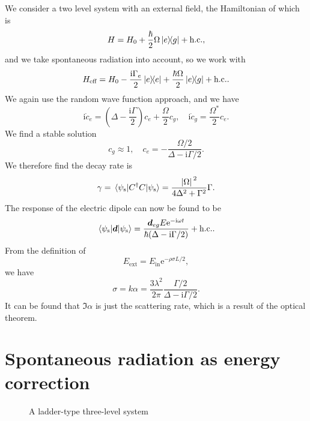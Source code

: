 \documentclass[hyperref, a4paper]{article}
\newcommand*{\ii}{\mathrm{i}}
\newcommand*{\ee}{\mathrm{e}}
\begin{document}
We consider a two level system with an external field, the Hamiltonian of which is  
\begin{equation}
    H = H_0 + \frac{\hbar}{2} \Omega \dyad{e}{g} + \text{h.c.},
\end{equation}
and we take spontaneous radiation into account, so we work with 
\begin{equation}
    H_\text{eff} = H_0 - \frac{\ii \Gamma_e}{2} \dyad{e} + \frac{\hbar \Omega}{2} \dyad{e}{g} + \text{h.c.}.
\end{equation} 
We again use the random wave function approach, and we have 
\begin{equation}
    \ii \dot{c}_e = \left( \Delta - \frac{\ii \Gamma}{2} \right) c_e + \frac{\Omega}{2} c_g, \quad
    \ii \dot{c}_g = \frac{\Omega^*}{2} c_e.
\end{equation}
We find a stable solution 
\begin{equation}
    c_g \approx 1, \quad c_e = - \frac{\Omega / 2}{\Delta - \ii \Gamma / 2}.
\end{equation}
We therefore find the decay rate is  
\begin{equation}
    \gamma = \mel*{\psi_\text{s}}{C^\dagger C}{\psi_\text{s}} = \frac{\abs*{\Omega}^2}{4 \Delta^2 + \Gamma^2} \Gamma.
\end{equation}
The response of the electric dipole can now be found to be 
\begin{equation}
    \expval*{\vb*{d}}{\psi_\text{s}} = \frac{\vb*{d}_{eg} E \ee^{- \ii \omega t}}{\hbar (\Delta - \ii \Gamma /2)} + \text{h.c.}.
\end{equation}
From the definition of 
\begin{equation}
    E_\text{ext} = E_\text{in} \ee^{- \rho \sigma L / 2},
\end{equation}
we have 
\begin{equation}
    \sigma = k \alpha = \frac{3 \lambda^2}{2 \pi} \frac{\Gamma / 2}{\Delta - \ii \Gamma / 2}.
\end{equation}
It can be found that $\Im \alpha$ is just the scattering rate, which is a result of the optical theorem.

\section{Spontaneous radiation as energy correction}

\begin{figure}
    \centering
    
    \caption{A ladder-type three-level system}
    \label{fig:ladder-system}
\end{figure}
\end{document}
